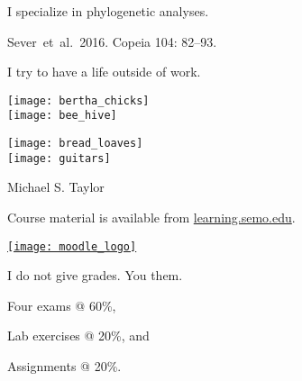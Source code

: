 \documentclass[t]{beamer}
\begin{document}
%
{
	\begin{frame}[t]{I specialize in phylogenetic analyses.}
		
		\vfilll
		
		\hfill \tiny Sever~et~al.~2016. Copeia 104: 82–93.
	\end{frame}
}
%
%		
%		
%		
%
%
\begin{frame}[t]{I try to have a life outside of work.}

	\vspace*{-\baselineskip}
	
	\begin{multicols}{2}
		\texttt{[image: bertha\_chicks]} \\[1ex]
		\texttt{[image: bee\_hive]} \\
		
	\columnbreak
		
		\texttt{[image: bread\_loaves]} \\[1ex]
		\texttt{[image: guitars]} \\
		
	\end{multicols}
		
		\vfilll

	\hfill \tiny Michael S. Taylor 

\end{frame}
%
\begin{frame}[t]{Course material is available from \href{http://learning.semo.edu}{learning.semo.edu}.}
	\begin{center}
		
		\href{http://learning.semo.edu}{\texttt{[image: moodle\_logo]}}
		
		\medskip
		
	\end{center}
	
\end{frame}
%
\begin{frame}[t]{I do not give grades. You  them.}

	\hangpara Four exams @ 60\%,

	\hangpara Lab exercises @ 20\%, and

	\hangpara Assignments @ 20\%.

\end{frame}
%
\end{document}
